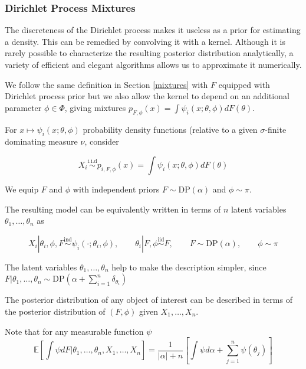 \documentclass[a4paper,11pt]{article}
\theoremstyle{theorem}
\theoremstyle{definition}
\theoremstyle{remark}
\providecommand{\E}{\mathbb{E}}
\begin{document}
\subsubsection{Dirichlet Process Mixtures}

The discreteness of the Dirichlet process makes it useless as a prior for estimating a density. This can be remedied by convolving it with a kernel. Although it is rarely possible to characterize the resulting posterior distribution analytically, a variety of efficient and elegant algorithms allows us to approximate it numerically.

We follow the same definition in Section \ref{mixtures} with $F$ equipped with Dirichlet process prior but we also allow the kernel to depend on an additional parameter $\phi \in \Phi$, giving mixtures $p_{F, \phi}(x) = \int{\psi_{i}(x;\theta, \phi)dF(\theta)}$.

For $x \mapsto \psi_i(x;\theta,\phi)$ probability density functions (relative to a given $\sigma$-finite dominating measure $\nu$, consider

\[
X_i \overset{\text{i.i.d}}{\sim} p_{i, F, \phi}(x) = \int{\psi_i(x; \theta, \phi)dF(\theta)} 
\]

We equip $F$ and $\phi$ with independent priors $F \sim \text{DP}(\alpha)$ and $\phi \sim \pi$.

The resulting model can be equivalently written in terms of $n$ latent variables $\theta_1, \dotsc, \theta_n$ as

\begin{equation} \label{model}
X_i | \theta_i, \phi, F \overset{\text{ind}}{\sim} \psi_i(\cdot; \theta_i, \phi), \qquad \theta_i | F, \phi \overset{\text{iid}}{\sim} F, \qquad F \sim \text{DP}(\alpha), \qquad \phi \sim \pi
\end{equation}

The latent variables $\theta_1, \dotsc, \theta_n$ help to make the description simpler, since $F | \theta_1, \dotsc, \theta_n \sim \text{DP}(\alpha + \sum_{i=1}^{n}{\delta_{\theta_i}})$

The posterior distribution of any object of interest can be described in terms of the posterior distribution of $(F, \phi)$ given $X_1, \dotsc, X_n$.

Note that for any measurable function $\psi$
\begin{equation} \label{condExp}
\E \left[ \int{\psi dF | \theta_1, \dotsc, \theta_n, X_1, \dotsc, X_n} \right] = \frac{1}{|\alpha| + n}\left[\int{\psi d\alpha} + \sum_{j=1}^{n}{\psi(\theta_j)}\right]
\end{equation}
\end{document}
